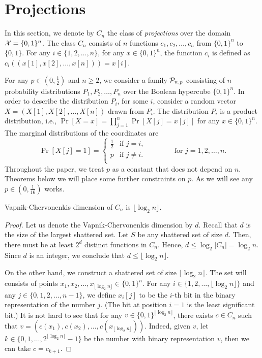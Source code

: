 \section{Projections}
\label{section:projections}

In this section, we denote by $C_n$ the class of \emph{projections} over the
domain $\X = \{0,1\}^n$. The class $C_n$ consists of $n$ functions $c_1, c_2,
\dots, c_n$ from $\{0,1\}^n$ to $\{0,1\}$. For any $i \in \{1,2,\dots,n\}$, for
any $x \in \{0,1\}^n$, the function $c_i$ is defined as $c_i((x[1], x[2], \dots,
x[n])) = x[i]$.

For any $p \in (0,\frac{1}{2})$ and $n \ge 2$, we consider a family $\P_{n,p}$
consisting of $n$ probability distributions $P_1, P_2, \dots, P_n$ over the
Boolean hypercube $\{0,1\}^n$. In order to describe the distribution $P_i$, for
some $i$, consider a random vector $X = (X[1], X[2], \dots, X[n])$ drawn from
$P_i$. The distribution $P_i$ is a product distribution, i.e., $\Pr[X = x] =
\prod_{j=1}^n \Pr[X[j] = x[j]]$ for any $x \in \{0,1\}^n$. The marginal
distributions of the coordinates are
$$
\Pr[X[j] = 1] =
\begin{cases}
\frac{1}{2} & \text{if $j = i$,} \\
p & \text{if $j\neq i$.} \\
\end{cases}
\qquad \qquad \text{for $j=1,2,\dots,n$.}
$$
Throughout the paper, we treat $p$ as a constant that does not depend on $n$.
Theorems below we will place some further constraints on $p$. As we will see any
$p \in (0,\frac{1}{16})$ works.

\begin{proposition}
\label{proposition:vc-dimension-projections}
Vapnik-Chervonenkis dimension of $C_n$ is $\lfloor \log_2 n \rfloor$.
\end{proposition}

\begin{proof}
Let us denote the Vapnik-Chervonenkis dimension by $d$. Recall that $d$ is the
size of the largest shattered set. Let $S$ be any shattered set of size $d$.
Then, there must be at least $2^d$ distinct functions in $C_n$. Hence, $d \le
\log_2 |C_n| = \log_2 n$. Since $d$ is an integer, we conclude that $d \le
\lfloor \log_2 n \rfloor$.

On the other hand, we construct a shattered set of size $\lfloor \log_2 n
\rfloor$. The set will consists of points $x_1, x_2, \dots, x_{\lfloor \log_2 n
\rfloor} \in \{0,1\}^n$. For any $i \in \{1,2,\dots,\lfloor \log_2 n \rfloor\}$
and any $j \in \{0,1,2,\dots,n-1\}$, we define $x_i[j]$ to be the $i$-th bit
in the binary representation of the number $j$. (The bit at position $i=1$ is the
least significant bit.) It is not hard to see that for any $v \in
\{0,1\}^{\lfloor \log_2 n \rfloor}$, there exists $c \in C_n$ such that $v =
(c(x_1), c(x_2), \dots, c(x_{\lfloor \log_2 n \rfloor}))$. Indeed, given $v$,
let $k \in \{0,1,\dots,2^{\lfloor \log_2 n \rfloor} - 1\}$ be the number with
binary representation $v$, then we can take $c = c_{k+1}$.
\end{proof}

